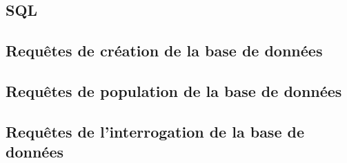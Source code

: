 \documentclass[a4paper,12pt]{article}
\begin{document}
\begin{appendices}
\section*{SQL}
\subsection{Requêtes de création de la base de données}

\subsection{Requêtes de population de la base de données}

\subsection{Requêtes de l'interrogation de la base de données }

\end{appendices}
\end{document}
